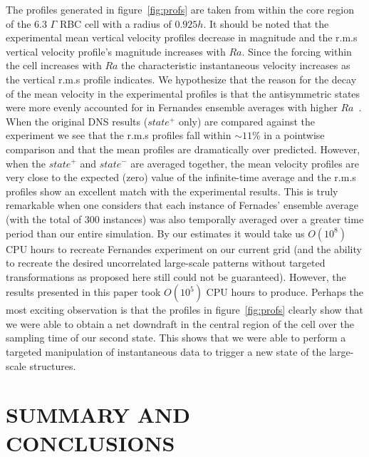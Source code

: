 \documentclass[twocolumn,10pt]{tsfp}
\begin{document}
The profiles generated in figure~\ref{fig:profs} are taken from within the core region of the 6.3 $\Gamma$ RBC cell with a radius of $0.925h$. It should be noted that the experimental mean vertical velocity profiles decrease in magnitude and the r.m.s vertical velocity profile's magnitude increases with $Ra$.  Since the forcing within the cell increases with $Ra$ the characteristic instantaneous velocity increases as the vertical r.m.s profile indicates. We hypothesize that the reason for the decay of the mean velocity in the experimental profiles is that the antisymmetric states were more evenly accounted for in Fernandes ensemble averages with higher $Ra$~\citep{fernandes2001spatial}. When the original DNS results ($state^+$ only) are compared against the experiment we see that the r.m.s profiles fall within $\sim11$\% in a pointwise comparison and that the mean profiles are dramatically over predicted.  However, when the $state^+$ and $state^-$ are averaged together, the mean velocity profiles are very close to the expected (zero) value of the infinite-time average and the r.m.s profiles show an excellent match with the experimental results. This is truly remarkable when one considers that each instance of Fernades' ensemble average (with the  total of 300 instances) was also temporally averaged over a greater time period than our entire simulation. By our estimates it would take us $O(10^8)$ CPU hours to recreate Fernandes experiment on our current grid (and the ability to recreate the desired uncorrelated large-scale patterns without targeted transformations as proposed here still could not be guaranteed). However, the results presented in this paper took $O(10^5)$ CPU hours to produce.  Perhaps the most exciting observation is that the profiles in figure~\ref{fig:profs} clearly show that we were able to obtain a net downdraft in the central region of the cell over the sampling time of our second state.   This shows that we were able to perform a targeted manipulation of instantaneous data to trigger a new state of the large-scale structures. 



\section*{SUMMARY AND CONCLUSIONS}
\end{document}

